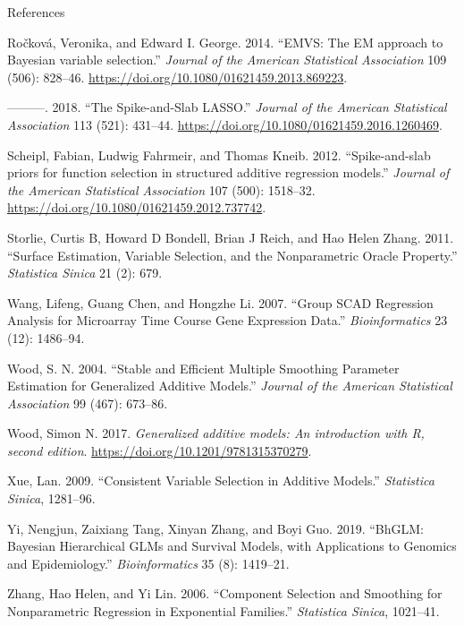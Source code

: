 \documentclass[
  ignorenonframetext,
  aspectratio=169]{beamer}
\newlength{\cslhangindent}
\newlength{\cslentryspacingunit} %
\newenvironment{CSLReferences}[2] %
 {%
  \setlength{\parindent}{0pt}
  \ifodd #1
  \let\oldpar\par
  \def\par{\hangindent=\cslhangindent\oldpar}
  \fi
  \setlength{\parskip}{#2\cslentryspacingunit}
 }%
 {}
\begin{document}
\begin{frame}[allowframebreaks]{References}
\begin{CSLReferences}{1}{0}
\leavevmode{}%
Ročková, Veronika, and Edward I. George. 2014. {``{EMVS: The EM approach
to Bayesian variable selection}.''} \emph{Journal of the American
Statistical Association} 109 (506): 828--46.
\url{https://doi.org/10.1080/01621459.2013.869223}.

\leavevmode{}%
---------. 2018. {``{The Spike-and-Slab LASSO}.''} \emph{Journal of the
American Statistical Association} 113 (521): 431--44.
\url{https://doi.org/10.1080/01621459.2016.1260469}.

\leavevmode{}%
Scheipl, Fabian, Ludwig Fahrmeir, and Thomas Kneib. 2012.
{``{Spike-and-slab priors for function selection in structured additive
regression models}.''} \emph{Journal of the American Statistical
Association} 107 (500): 1518--32.
\url{https://doi.org/10.1080/01621459.2012.737742}.

\leavevmode{}%
Storlie, Curtis B, Howard D Bondell, Brian J Reich, and Hao Helen Zhang.
2011. {``Surface Estimation, Variable Selection, and the Nonparametric
Oracle Property.''} \emph{Statistica Sinica} 21 (2): 679.

\leavevmode{}%
Wang, Lifeng, Guang Chen, and Hongzhe Li. 2007. {``Group SCAD Regression
Analysis for Microarray Time Course Gene Expression Data.''}
\emph{Bioinformatics} 23 (12): 1486--94.

\leavevmode{}%
Wood, S. N. 2004. {``Stable and Efficient Multiple Smoothing Parameter
Estimation for Generalized Additive Models.''} \emph{Journal of the
American Statistical Association} 99 (467): 673--86.

\leavevmode{}%
Wood, Simon N. 2017. \emph{{Generalized additive models: An introduction
with R, second edition}}. \url{https://doi.org/10.1201/9781315370279}.

\leavevmode{}%
Xue, Lan. 2009. {``Consistent Variable Selection in Additive Models.''}
\emph{Statistica Sinica}, 1281--96.

\leavevmode{}%
Yi, Nengjun, Zaixiang Tang, Xinyan Zhang, and Boyi Guo. 2019. {``BhGLM:
Bayesian Hierarchical GLMs and Survival Models, with Applications to
Genomics and Epidemiology.''} \emph{Bioinformatics} 35 (8): 1419--21.

\leavevmode{}%
Zhang, Hao Helen, and Yi Lin. 2006. {``Component Selection and Smoothing
for Nonparametric Regression in Exponential Families.''}
\emph{Statistica Sinica}, 1021--41.

\end{CSLReferences}
\end{frame}
\end{document}
